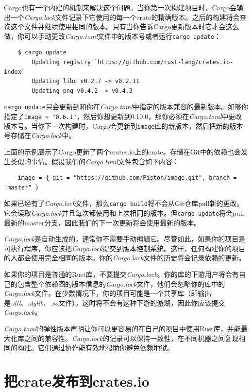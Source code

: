 Cargo也有一个内建的机制来解决这个问题。当你第一次构建项目时，Cargo会输出一个\emph{Cargo.lock}文件记录下它使用的每一个crate的精确版本。之后的构建将会查询这个文件并继续使用相同的版本。只有当你告诉Cargo更新版本时它才会这么做，你可以手动更改\emph{Cargo.toml}文件中的版本号或者运行\texttt{cargo update}：
\begin{verbatim}
    $ cargo update
        Updating registry `https://github.com/rust-lang/crates.io-index`
        Updating libc v0.2.7 -> v0.2.11
        Updating png v0.4.2 -> v0.4.3
\end{verbatim}

\texttt{cargo update}只会更新到和你在\emph{Cargo.toml}中指定的版本兼容的最新版本。如够你指定了\texttt{image = "0.6.1"}，然后你想更新到0.10.0，那你必须在\emph{Cargo.toml}中更改版本号。当你下一次构建时，Cargo会更新到\texttt{image}库的新版本，然后把新的版本号存储在\emph{Cargo.lock}中。

上面的示例展示了Cargo更新了两个crates.io上的crate。存储在Git中的依赖也会发生类似的事情。假设我们的\emph{Cargo.toml}文件包含如下内容：
\begin{verbatim}
    image = { git = "https://github.com/Piston/image.git", branch = "master" }
\end{verbatim}

如果已经有了\emph{Cargo.lock}文件，那么\texttt{cargo build}将不会从Git仓库pull新的更改。它会读取\emph{Cargo.lock}并且每次都使用和上次相同的版本。但\texttt{cargo update}将会pull最新的master分支，因此我们的下一次更新将会使用最新的版本。

\emph{Cargo.lock}是自动生成的，通常你不需要手动编辑它。尽管如此，如果你的项目是可执行程序，你应该把\emph{Cargo.lock}提交到版本控制系统。这样，任何构建你的项目的人都会使用完全相同的版本。你的\emph{Cargo.lock}文件的历史将会记录依赖的更新。

如果你的项目是普通的Rust库，不要提交\emph{Cargo.lock}。你的库的下游用户将会有自己的包含整个依赖图的版本信息的\emph{Cargo.lock}文件，他们会忽略你的库中的\emph{Cargo.lock}文件。在少数情况下，你的项目可能是一个共享库（即输出是\emph{.dll}、\emph{.dylib}、\emph{.so}文件），这时将不会有这种下游的游湖，因此你应该提交\emph{Cargo.lock}。

\emph{Cargo.toml}的弹性版本声明让你可以更容易的在自己的项目中使用Rust库，并能最大化库之间的兼容性。\emph{Cargo.lock}的记录可以保持一致性，在不同机器之间复现相同的构建。它们通过协作能有效地帮助你避免依赖地狱。

\section{把crate发布到crates.io}

